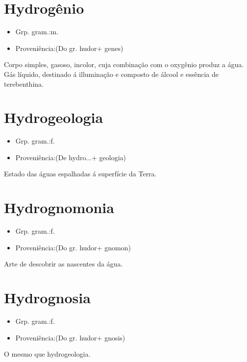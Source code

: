 \documentclass{article}
\begin{document}
\section{Hydrogênio}
\begin{itemize}
\item {Grp. gram.:m.}
\end{itemize}
\begin{itemize}
\item {Proveniência:(Do gr. \textunderscore hudor\textunderscore  + \textunderscore genes\textunderscore )}
\end{itemize}
Corpo simples, gasoso, incolor, cuja combinação com o oxygênio produz a água.
Gás líquido, destinado á illuminação e composto de álcool e essência de terebenthina.
\section{Hydrogeologia}
\begin{itemize}
\item {Grp. gram.:f.}
\end{itemize}
\begin{itemize}
\item {Proveniência:(De \textunderscore hydro...\textunderscore  + \textunderscore geologia\textunderscore )}
\end{itemize}
Estado das águas espalhadas á superfície da Terra.
\section{Hydrognomonia}
\begin{itemize}
\item {Grp. gram.:f.}
\end{itemize}
\begin{itemize}
\item {Proveniência:(Do gr. \textunderscore hudor\textunderscore  + \textunderscore gnomon\textunderscore )}
\end{itemize}
Arte de descobrir as nascentes da água.
\section{Hydrognosia}
\begin{itemize}
\item {Grp. gram.:f.}
\end{itemize}
\begin{itemize}
\item {Proveniência:(Do gr. \textunderscore hudor\textunderscore  + \textunderscore gnosis\textunderscore )}
\end{itemize}
O mesmo que \textunderscore hydrogeologia\textunderscore .
\end{document}
